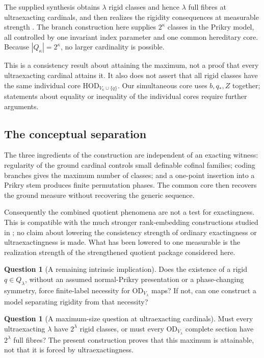\documentclass[11pt,letterpaper]{article}
\theoremstyle{definition}
\newtheorem{question}[definition]{Question}
\numberwithin{equation}{section}
\newcommand{\OD}{\mathrm{OD}}
\newcommand{\HOD}{\mathrm{HOD}}
\begin{document}
The supplied synthesis obtains $\lambda$ rigid classes and hence $\lambda$ full fibres at ultraexacting cardinals, and then realizes the rigidity consequences at measurable strength \cite{synthesis}. The branch construction here supplies $2^\kappa$ classes in the Prikry model, all controlled by one invariant index parameter and one common hereditary core. Because $|Q_\kappa|=2^\kappa$, no larger cardinality is possible.

This is a consistency result about attaining the maximum, not a proof that every ultraexacting cardinal attains it. It also does not assert that all rigid classes have the same individual core $\HOD_{V_\kappa\cup\{q\}}$. Our simultaneous core uses $b,q_*,Z$ together; statements about equality or inequality of the individual cores require further arguments.

\subsection{The conceptual separation}

The three ingredients of the construction are independent of an exacting witness: regularity of the ground cardinal controls small definable cofinal families; coding branches gives the maximum number of classes; and a one-point insertion into a Prikry stem produces finite permutation phases. The common core then recovers the ground measure without recovering the generic sequence.

Consequently the combined quotient phenomena are not a test for exactingness. This is compatible with the much stronger rank-embedding constructions studied in \cite{abl,abgl}; no claim about lowering the consistency strength of ordinary exactingness or ultraexactingness is made. What has been lowered to one measurable is the realization strength of the strengthened quotient package considered here.

\begin{question}[A remaining intrinsic implication]
Does the existence of a rigid $q\in Q_\lambda$, without an assumed normal-Prikry presentation or a phase-changing symmetry, force finite-label necessity for $\OD_{V_\lambda}$ maps? If not, can one construct a model separating rigidity from that necessity?
\end{question}

\begin{question}[A maximum-size question at ultraexacting cardinals]
Must every ultraexacting $\lambda$ have $2^\lambda$ rigid classes, or must every $\OD_{V_\lambda}$ complete section have $2^\lambda$ full fibres? The present construction proves that this maximum is attainable, not that it is forced by ultraexactingness.
\end{question}
\end{document}
